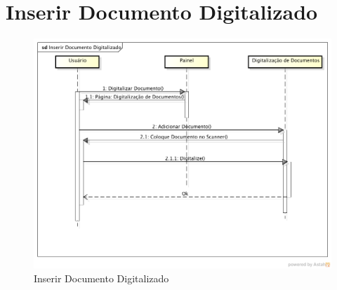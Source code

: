 \documentclass[12pt,a4paper]{report}
\begin{document}
\section{Inserir Documento Digitalizado}
\begin{figure}[H]
\centering
\includegraphics[width=\textwidth]{inserir-documento-digitalizado.png}
\caption{Inserir Documento Digitalizado}
\label{fig:digitalizar}
\end{figure}
\end{document}
